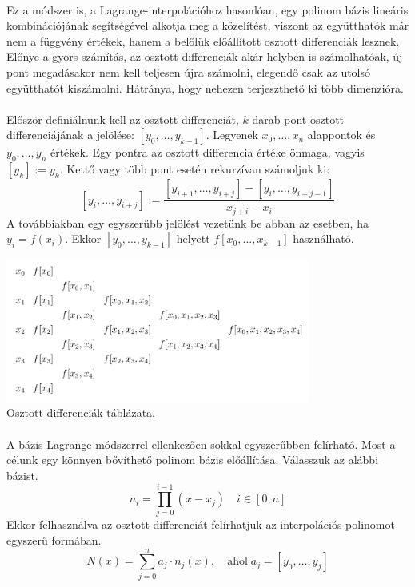 \documentclass{elteikthesis}
\begin{document}
\paragraph{}
Ez a módszer is, a Lagrange-interpolációhoz hasonlóan, egy polinom bázis lineáris kombinációjának segítségével alkotja meg a közelítést, viszont az együtthatók már nem a függvény értékek, hanem a belőlük előállított osztott differenciák lesznek. Előnye a gyors számítás, az osztott differenciák akár helyben is számolhatóak, új pont megadásakor nem kell teljesen újra számolni, elegendő csak az utolsó együtthatót kiszámolni. Hátránya, hogy nehezen terjeszthető ki több dimenzióra.
\paragraph{}
Először definiálnunk kell az osztott differenciát, $k$ darab pont osztott differenciájának a jelölése: $[y_0, \dots, y_{k-1}]$. Legyenek $x_0, \dots, x_n$ alappontok és $y_0, \dots, y_n$ értékek. Egy pontra az osztott differencia értéke önmaga, vagyis $[y_k] := y_k$. Kettő vagy több pont esetén rekurzívan számoljuk ki:
$$
[y_i, \dots, y_{i+j}] := \frac{[y_{i+1}, \dots, y_{i+j}] - [y_{i}, \dots, y_{i+j-1}]}{x_{j+i} - x_i}
$$
A továbbiakban egy egyszerűbb jelölést vezetünk be abban az esetben, ha $y_i = f(x_i)$. Ekkor $[y_0, \dots, y_{k-1}]$ helyett $f[x_0, \dots, x_{k-1}]$ használható.
\begin{center}
\includegraphics[width=10cm]{pics/divide_difference_table}\\
{\footnotesize Osztott differenciák táblázata.}
\end{center}
\paragraph{}
A bázis Lagrange módszerrel ellenkezően sokkal egyszerűbben felírható. Most a célunk egy könnyen bővíthető polinom bázis előállítása. Válasszuk az alábbi bázist.
$$
n_i = \prod_{j = 0}^{i-1}(x-x_j) \quad i \in [0, n]
$$
Ekkor felhasználva az osztott differenciát felírhatjuk az interpolációs polinomot egyszerű formában.
$$
N(x) = \sum_{j=0}^{n}a_j \cdot n_j(x), \quad \mbox{ahol} \; a_j = [y_0, \dots ,y_j]
$$
\end{document}
